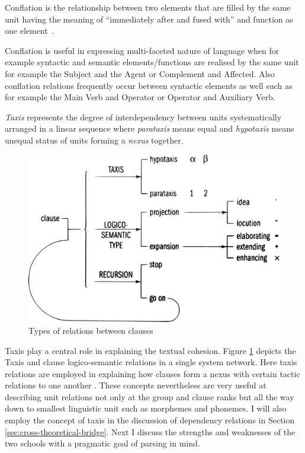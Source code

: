 \begin{definition}[Conflation]\label{def:conflation}
	Conflation is the relationship between two elements that are filled by the same unit having the meaning of ``immediately after and fused with'' and function as one element\ \citep[pp.249--250]{Fawcett2000}. 
\end{definition}

Conflation is useful in expressing multi-faceted nature of language when for example syntactic and semantic elements/functions are realised by the same unit for example the Subject and the Agent or Complement and Affected. Also conflation relations frequently occur between syntactic elements as well such as for example the Main Verb and Operator or Operator and Auxiliary Verb.

\begin{definition}[Taxis]\label{def:taxis}
	\textit{Taxis} represents the degree of interdependency between units systematically arranged in a linear sequence where \textit{parataxis} means equal and \textit{hypotaxis} means unequal status of units forming a \textit{nexus} together.
\end{definition}

\begin{figure}[!ht]
	\centering
	\includegraphics[width=0.678\linewidth]{Figures/SFL-grammar/taxis.pdf}
	\caption{Types of relations between clauses \citep[p.438]{Halliday2013}}
	\label{fig:taxis}
\end{figure}

Taxis play a central role in explaining the textual cohesion. Figure \ref{fig:taxis} depicts the Taxis and clause logico-semantic relations in a single system network. Here taxis relations are employed in explaining how clauses form a nexus with certain tactic relations to one another \citep[pp. 438 -- 443]{Halliday2013}. These concepts nevertheless are very useful at describing unit relations not only at the group and clause ranks but all the way down to smallest linguistic unit such as morphemes and phonemes. I will also employ the concept of taxis in the discussion of dependency relations in Section \ref{sec:cross-theoretical-bridge}. Next I discuss the strengths and weaknesses of the two schools with a pragmatic goal of parsing in mind. 

